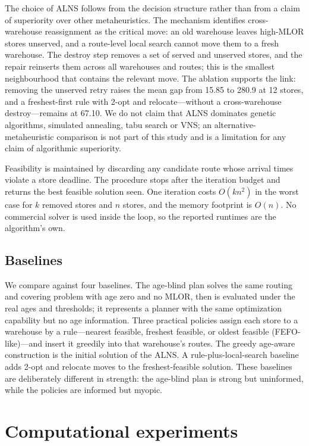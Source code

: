 \documentclass[preprint,12pt]{elsarticle}
\begin{document}
The choice of ALNS follows from the decision structure rather than from a claim of superiority over other metaheuristics. The mechanism identifies cross-warehouse reassignment as the critical move: an old warehouse leaves high-MLOR stores unserved, and a route-level local search cannot move them to a fresh warehouse. The destroy step removes a set of served and unserved stores, and the repair reinserts them across all warehouses and routes; this is the smallest neighbourhood that contains the relevant move. The ablation supports the link: removing the unserved retry raises the mean gap from 15.85 to 280.9 at 12 stores, and a freshest-first rule with 2-opt and relocate---without a cross-warehouse destroy---remains at 67.10. We do not claim that ALNS dominates genetic algorithms, simulated annealing, tabu search or VNS; an alternative-metaheuristic comparison is not part of this study and is a limitation for any claim of algorithmic superiority.

Feasibility is maintained by discarding any candidate route whose arrival times violate a store deadline. The procedure stops after the iteration budget and returns the best feasible solution seen. One iteration costs $O(kn^2)$ in the worst case for $k$ removed stores and $n$ stores, and the memory footprint is $O(n)$. No commercial solver is used inside the loop, so the reported runtimes are the algorithm's own.

\subsection{Baselines}

We compare against four baselines. The age-blind plan solves the same routing and covering problem with age zero and no MLOR, then is evaluated under the real ages and thresholds; it represents a planner with the same optimization capability but no age information. Three practical policies assign each store to a warehouse by a rule---nearest feasible, freshest feasible, or oldest feasible (FEFO-like)---and insert it greedily into that warehouse's routes. The greedy age-aware construction is the initial solution of the ALNS. A rule-plus-local-search baseline adds 2-opt and relocate moves to the freshest-feasible solution. These baselines are deliberately different in strength: the age-blind plan is strong but uninformed, while the policies are informed but myopic.

\section{Computational experiments}
\label{sec:experiments}
\end{document}
